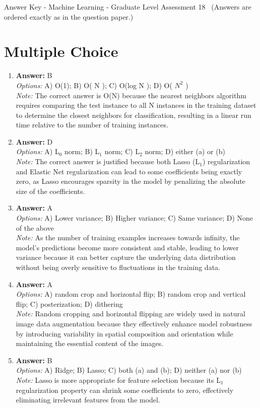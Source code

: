 \documentclass[12pt]{article}
\begin{document}
\begin{center}
Answer Key - Machine Learning - Graduate Level Assessment 18 \
\small (Answers are ordered exactly as in the question paper.)
\end{center}

\section*{Multiple Choice}
\begin{enumerate}[label=\arabic*.]
\item \textbf{Answer:} B
\\ \textit{Options:} A) O(1); B) O( N ); C) O(log N ); D) O( $N^2$ )
\\ \textit{Note:} The correct answer is O(N) because the nearest neighbors algorithm requires comparing the test instance to all N instances in the training dataset to determine the closest neighbors for classification, resulting in a linear run time relative to the number of training instances.
\item \textbf{Answer:} D
\\ \textit{Options:} A) L$_{0}$ norm; B) L$_{1}$ norm; C) L$_{2}$ norm; D) either (a) or (b)
\\ \textit{Note:} The correct answer is justified because both Lasso (L$_{1}$) regularization and Elastic Net regularization can lead to some coefficients being exactly zero, as Lasso encourages sparsity in the model by penalizing the absolute size of the coefficients.
\item \textbf{Answer:} A
\\ \textit{Options:} A) Lower variance; B) Higher variance; C) Same variance; D) None of the above
\\ \textit{Note:} As the number of training examples increases towards infinity, the model's predictions become more consistent and stable, leading to lower variance because it can better capture the underlying data distribution without being overly sensitive to fluctuations in the training data.
\item \textbf{Answer:} A
\\ \textit{Options:} A) random crop and horizontal flip; B) random crop and vertical flip; C) posterization; D) dithering
\\ \textit{Note:} Random cropping and horizontal flipping are widely used in natural image data augmentation because they effectively enhance model robustness by introducing variability in spatial composition and orientation while maintaining the essential content of the images.
\item \textbf{Answer:} B
\\ \textit{Options:} A) Ridge; B) Lasso; C) both (a) and (b); D) neither (a) nor (b)
\\ \textit{Note:} Lasso is more appropriate for feature selection because its L$_{1}$ regularization property can shrink some coefficients to zero, effectively eliminating irrelevant features from the model.
\end{enumerate}
\end{document}
